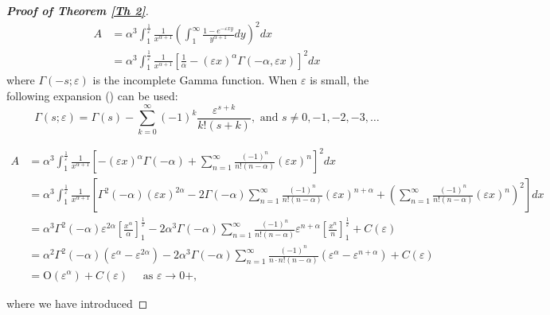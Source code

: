 \documentclass[11pt, reqno]{amsart}
\numberwithin{equation}{section}
\theoremstyle{plain} %
\theoremstyle{definition} %
\newcommand{\eps}{\varepsilon}
\begin{document}
\begin{proof}[{\bf Proof of Theorem \ref{Th 2}}]
{\[ 
\begin{aligned} A & =\alpha^3 \int_1^{\frac{1}{\varepsilon}} \frac{1}{x^{\alpha+1}}\left(\int_1^{\infty} \frac{1-e^{-\varepsilon x y}}{y^{\alpha+1}} d y\right)^2 d x \\ & =\alpha^3 \int_1^{\frac{1}{\varepsilon}} \frac{1}{x^{\alpha+1}}\left[\frac{1}{\alpha}-(\varepsilon x)^\alpha \Gamma(-\alpha, \varepsilon x)\right]^2 d x\end{aligned}
\]
where $\Gamma \left(-s;\eps \right)$ is the incomplete Gamma function. When $\eps$ is small, the following expansion (\cite{bender1999advanced}) can be used:
\begin{equation} \label{eq: Gamma incomplete expansion}
    \Gamma(s; \eps) = \Gamma(s) - \sum_{k=0}^{\infty}(-1)^k \frac{\eps^{s+k}}{k! (s+k)},  \text{ and } s \neq 0, -1, -2, -3, \dots
\end{equation}

\[
\begin{aligned} A & =\alpha^3 \int_1^{\frac{1}{\varepsilon}} \frac{1}{x^{\alpha+1}}\left[-(\varepsilon x)^\alpha \Gamma(-\alpha)+\sum_{n=1}^{\infty} \frac{(-1)^n}{n!(n-\alpha)}(\varepsilon x)^n\right]^2 d x \\ & =\alpha^3 \int_1^{\frac{1}{\varepsilon}} \frac{1}{x^{\alpha+1}}\left[\Gamma^2(-\alpha)(\varepsilon x)^{2 \alpha}-2 \Gamma(-\alpha) \sum_{n=1}^{\infty} \frac{(-1)^n}{n!(n-\alpha)}(\varepsilon x)^{n+\alpha}+\left(\sum_{n=1}^{\infty} \frac{(-1)^n}{n!(n-\alpha)}(\varepsilon x)^n\right)^2\right] d x \\ & =\alpha^3 \Gamma^2(-\alpha) \varepsilon^{2 \alpha}\left[\frac{x^\alpha}{\alpha}\right]_1^{\frac{1}{\varepsilon}}-2 \alpha^3 \Gamma(-\alpha) \sum_{n=1}^{\infty} \frac{(-1)^n}{n!(n-\alpha)} \varepsilon^{n+\alpha}\left[\frac{x^n}{n}\right]_1^{\frac{1}{\varepsilon}}+C(\eps) \\ & =\alpha^2 \Gamma^2(-\alpha)\left(\varepsilon^\alpha-\varepsilon^{2 \alpha}\right)-2 \alpha^3 \Gamma(-\alpha) \sum_{n=1}^{\infty} \frac{(-1)^n}{n \cdot n!(n-\alpha)}\left(\varepsilon^\alpha-\varepsilon^{n+\alpha}\right)+C(\eps) \\ & =\mathrm{O}\left(\varepsilon^\alpha\right)+C(\eps) \quad \text { as } \varepsilon \rightarrow 0+,\end{aligned}
\]

where we have introduced

}
\end{proof}
\end{document}
